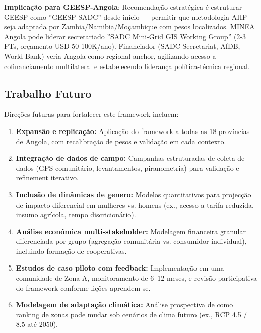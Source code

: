 \documentclass[12pt, a4paper]{article}
\begin{document}
\textbf{Implicação para GEESP-Angola}: Recomendação estratégica é estruturar GEESP como ''GEESP-SADC'' desde início — permitir que metodologia AHP seja adaptada por Zambia/Namibia/Moçambique com pesos localizados. MINEA Angola pode liderar secretariado ''SADC Mini-Grid GIS Working Group'' (2-3 PTs, orçamento USD 50-100K/ano). Financiador (SADC Secretariat, AfDB, World Bank) veria Angola como regional anchor, agilizando acesso a cofinanciamento multilateral e estabelecendo liderança política-técnica regional.

\subsection{Trabalho Futuro}

Direções futuras para fortalecer este framework incluem:

\begin{enumerate}

\item \textbf{Expansão e replicação:} Aplicação do framework a todas as 18 províncias de Angola, com recalibração de pesos e validação em cada contexto.

\item \textbf{Integração de dados de campo:} Campanhas estruturadas de coleta de dados (GPS comunitário, levantamentos, piranometria) para validação e refinement iterativo.

\item \textbf{Inclusão de dinâmicas de genero:} Modelos quantitativos para projecção de impacto diferencial em mulheres vs. homens (ex., acesso a tarifa reduzida, insumo agrícola, tempo discricionário).

\item \textbf{Análise económica multi-stakeholder:} Modelagem financeira granular diferenciada por grupo (agregação comunitária vs. consumidor individual), incluindo formação de cooperativas.

\item \textbf{Estudos de caso piloto com feedback:} Implementação em uma comunidade de Zona A, monitoramento de 6--12 meses, e revisão participativa do framework conforme lições aprendem-se.

\item \textbf{Modelagem de adaptação climática:} Análise prospectiva de como ranking de zonas pode mudar sob cenários de clima futuro (ex., RCP 4.5 / 8.5 até 2050).

\end{enumerate}
\end{document}

